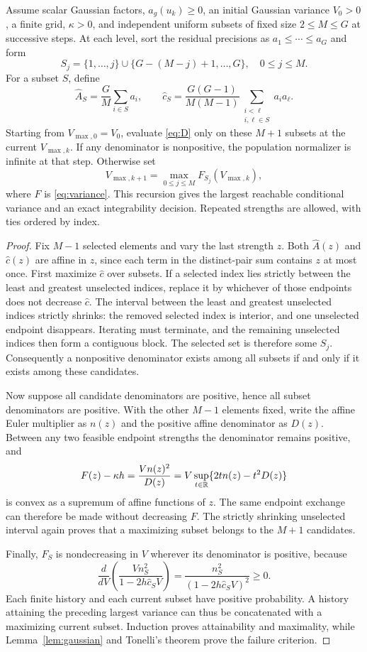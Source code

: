 \begin{theorem}\label{thm:without-replacement}
Assume scalar Gaussian factors, $a_g(u_k)\ge0$, an initial Gaussian variance $V_0>0$, a finite grid, $\kappa>0$, and independent uniform subsets of fixed size $2\le M\le G$ at successive steps. At each level, sort the residual precisions as $a_1\le\cdots\le a_G$ and form
\[
 S_j=\{1,\ldots,j\}\cup\{G-(M-j)+1,\ldots,G\},\quad 0\le j\le M.
\]
For a subset $S$, define
\[
 \widehat A_S=\frac GM\sum_{i\in S}a_i,\qquad
 \widehat c_S=\frac{G(G-1)}{M(M-1)}\sum_{\substack{i<\ell\\i,\ell\in S}}a_i a_\ell.
\]
Starting from $V_{\max,0}=V_0$, evaluate \eqref{eq:D} only on these $M+1$ subsets at the current $V_{\max,k}$. If any denominator is nonpositive, the population normalizer is infinite at that step. Otherwise set
\[
 V_{\max,k+1}=\max_{0\le j\le M}F_{S_j}(V_{\max,k}),
\]
where $F$ is \eqref{eq:variance}. This recursion gives the largest reachable conditional variance and an exact integrability decision. Repeated strengths are allowed, with ties ordered by index.
\end{theorem}
\begin{proof}
Fix $M-1$ selected elements and vary the last strength $z$. Both $\widehat A(z)$ and $\widehat c(z)$ are affine in $z$, since each term in the distinct-pair sum contains $z$ at most once. First maximize $\widehat c$ over subsets. If a selected index lies strictly between the least and greatest unselected indices, replace it by whichever of those endpoints does not decrease $\widehat c$. The interval between the least and greatest unselected indices strictly shrinks: the removed selected index is interior, and one unselected endpoint disappears. Iterating must terminate, and the remaining unselected indices then form a contiguous block. The selected set is therefore some $S_j$. Consequently a nonpositive denominator exists among all subsets if and only if it exists among these candidates.

Now suppose all candidate denominators are positive, hence all subset denominators are positive. With the other $M-1$ elements fixed, write the affine Euler multiplier as $n(z)$ and the positive affine denominator as $D(z)$. Between any two feasible endpoint strengths the denominator remains positive, and
\[
 F(z)-\kappa h=\frac{V n(z)^2}{D(z)}
 =V\sup_{t\in\mathbb R}\{2t n(z)-t^2D(z)\}
\]
is convex as a supremum of affine functions of $z$. The same endpoint exchange can therefore be made without decreasing $F$. The strictly shrinking unselected interval again proves that a maximizing subset belongs to the $M+1$ candidates.

Finally, $F_S$ is nondecreasing in $V$ wherever its denominator is positive, because
\[
 \frac{d}{dV}\left(\frac{Vn_S^2}{1-2h\widehat c_S V}\right)
 =\frac{n_S^2}{(1-2h\widehat c_S V)^2}\ge0.
\]
Each finite history and each current subset have positive probability. A history attaining the preceding largest variance can thus be concatenated with a maximizing current subset. Induction proves attainability and maximality, while Lemma~\ref{lem:gaussian} and Tonelli's theorem prove the failure criterion.
\end{proof}

